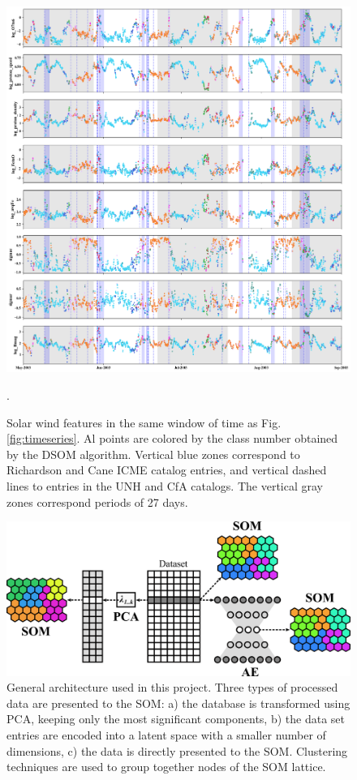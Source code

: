 \documentclass[utf8]{frontiersSCNS} %
\begin{document}
\begin{figure}[h!]
	\begin{center}
		\includegraphics[width=18cm]{Amaya/tsfeatures-som}%
	\end{center}
	\caption{Solar wind features in the same window of time as Fig.\ref{fig:timeseries}. Al points are colored by the class number obtained by the DSOM algorithm. Vertical blue zones correspond to Richardson and Cane ICME catalog entries, and vertical dashed lines to entries in the UNH and CfA catalogs. The vertical gray zones correspond periods of 27 days.}\label{fig:tsfeatures-som}.
\end{figure}

\begin{figure}[h!]
	\begin{center}
		\includegraphics[width=12cm]{architecture}%
	\end{center}
	\caption{General architecture used in this project. Three types of processed data are presented to the SOM: a) the database is transformed using PCA, keeping only the most significant components, b) the data set entries are encoded into a latent space with a smaller number of dimensions, c) the data is directly presented to the SOM. Clustering techniques are used to group together nodes of the SOM lattice.}\label{fig:architecture}
\end{figure}
\end{document}
